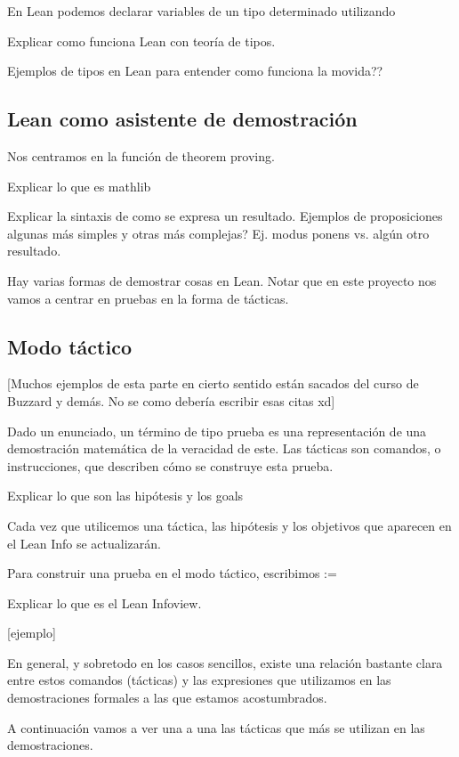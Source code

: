 \documentclass{article}
\begin{document}
En Lean podemos declarar variables de un tipo determinado utilizando 

Explicar como funciona Lean con teoría de tipos.

Ejemplos de tipos en Lean para entender como funciona la movida??


\subsection{Lean como asistente de demostración}

Nos centramos en la función de theorem proving.

Explicar lo que es mathlib

Explicar la sintaxis de como se expresa un resultado. Ejemplos de proposiciones algunas más simples y otras más complejas? Ej. modus ponens vs. algún otro resultado.

Hay varias formas de demostrar cosas en Lean. Notar que en este proyecto nos vamos a centrar en pruebas en la forma de tácticas.


\subsection{Modo táctico}

[Muchos ejemplos de esta parte en cierto sentido están sacados del curso de Buzzard y demás. No se como debería escribir esas citas xd]

Dado un enunciado, un término de tipo prueba es una representación de una demostración matemática de la veracidad de este. Las tácticas son comandos, o instrucciones, que describen cómo se construye esta prueba.

Explicar lo que son las hipótesis y los goals

Cada vez que utilicemos una táctica, las hipótesis y los objetivos que aparecen en el Lean Info se actualizarán.

Para construir una prueba en el modo táctico, escribimos :=

Explicar lo que es el Lean Infoview.

[ejemplo]

En general, y sobretodo en los casos sencillos, existe una relación bastante clara entre estos comandos (tácticas) y las expresiones que utilizamos en las demostraciones formales a las que estamos acostumbrados.

A continuación vamos a ver una a una las tácticas que más se utilizan en las demostraciones.
\end{document}
